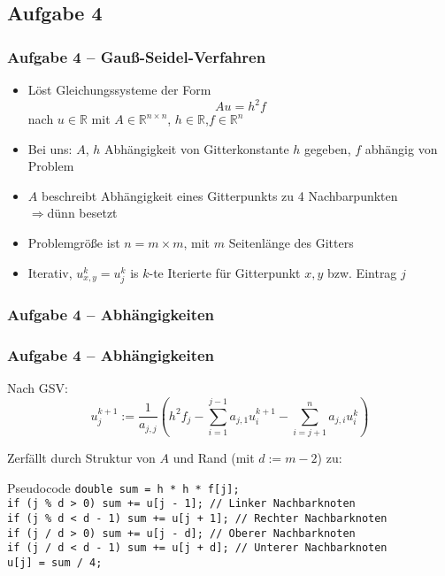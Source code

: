 \documentclass[german,notes,18pt]{beamer}
\begin{document}
	\subsection{Aufgabe 4}
	\begin{frame}
		\frametitle{Aufgabe 4 -- Gauß-Seidel-Verfahren}
		\begin{itemize}
			\item Löst Gleichungssysteme der Form
			\begin{equation*}
			Au=h^2f
			\end{equation*}
			nach $u\in\mathbb{R}$ mit $A\in\mathbb{R}^{n\times n}$, $h\in\mathbb{R}$,$f\in\mathbb{R}^n$
			\item Bei uns: $A$, $h$ Abhängigkeit von Gitterkonstante $h$ gegeben, $f$ abhängig von Problem
			\item $A$ beschreibt Abhängigkeit eines Gitterpunkts zu 4 Nachbarpunkten\\
			$\Rightarrow$dünn besetzt
			\item Problemgröße ist $n=m\times m$, mit $m$ Seitenlänge des Gitters
			\item Iterativ, $u_{x,y}^k=u_j^k$ is $k$-te Iterierte für Gitterpunkt $x,y$ bzw. Eintrag $j$
		\end{itemize}
		
	\end{frame}
	\begin{frame}
		\frametitle{Aufgabe 4 -- Abhängigkeiten}
		
		\begin{figure}
			\def\svgwidth{0.6\textwidth}
			\small
			
		\end{figure}
		
	\end{frame}
	\begin{frame}
		\frametitle{Aufgabe 4 -- Abhängigkeiten}
		
		Nach GSV:
		\begin{equation*}
		u_j^{k+1}:=\frac{1}{a_{j,j}}(h^2f_j-\sum_{i=1}^{j-1}a_{j,1}u_i^{k+1}-\sum_{i=j+1}^{n}a_{j,i}u_i^k)
		\end{equation*}
		
		Zerfällt durch Struktur von $A$ und Rand (mit $d:=m-2$) zu:
		\begin{block}{Pseudocode}
			\small
			\texttt{double sum = h * h * f[j]; \\
			if (j \% d > 0) sum += u[j - 1];     // Linker Nachbarknoten \\
			if (j \% d < d - 1) sum += u[j + 1]; // Rechter Nachbarknoten \\
			if (j / d > 0) sum += u[j - d];     // Oberer Nachbarknoten \\
			if (j / d < d - 1) sum += u[j + d]; // Unterer Nachbarknoten \\
			u[j] = sum / 4;}
		\end{block}
	\end{frame}
\end{document}
